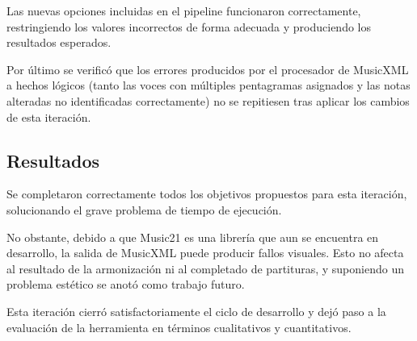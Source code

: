 Las nuevas opciones incluidas en el pipeline funcionaron correctamente, restringiendo los valores incorrectos de forma adecuada y produciendo los resultados esperados.

Por último se verificó que los errores producidos por el procesador de MusicXML a hechos lógicos (tanto las voces con múltiples pentagramas asignados y las notas alteradas no identificadas correctamente) no se repitiesen tras aplicar los cambios de esta iteración.

\subsection{Resultados}
\label{subsec:eighth_iteration_results}
Se completaron correctamente todos los objetivos propuestos para esta iteración, solucionando el grave problema de tiempo de ejecución.

No obstante, debido a que Music21 es una librería que aun se encuentra en desarrollo, la salida de MusicXML puede producir fallos visuales. Esto no afecta al resultado de la armonización ni al completado de partituras, y suponiendo un problema estético se anotó como trabajo futuro.

Esta iteración cierró satisfactoriamente el ciclo de desarrollo y dejó paso a la evaluación de la herramienta en términos cualitativos y cuantitativos.
